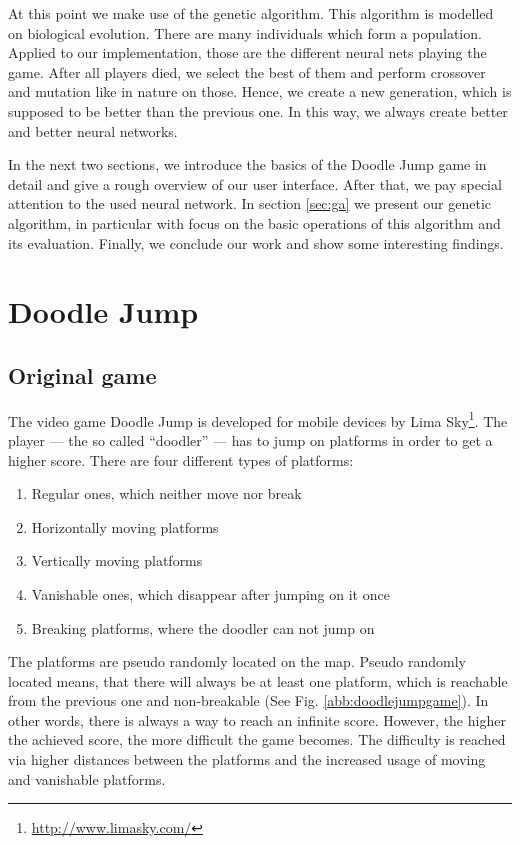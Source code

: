 \documentclass[a4paper,12pt,pagesize,headsepline,bibtotoc,titlepage,abstracton]{scrartcl}
\newcommand{\quot}[1]{{``#1''}}
\begin{document}
At this point we make use of the genetic algorithm. This algorithm is modelled on biological evolution. There are many individuals which form a population. Applied to our implementation, those are the different neural nets playing the game. After all players died, we select the best of them and perform crossover and mutation like in nature on those. Hence, we create a new generation, which is supposed to be better than the previous one. In this way, we always create better and better neural networks.

In the next two sections, we introduce the basics of the Doodle Jump game in detail and give a rough overview of our user interface. After that, we pay special attention to the used neural network. In section \ref{sec:ga} we present our genetic algorithm, in particular with focus on the basic operations of this algorithm and its evaluation. Finally, we conclude our work and show some interesting findings.

\section{Doodle Jump}
\subsection{Original game}
\label{sec:og}

The video game Doodle Jump is developed for mobile devices by Lima Sky\footnote{\url{http://www.limasky.com/}}. The player --- the so called \quot{doodler} --- has to jump on platforms in order to get a higher score. There are four different types of platforms:
\begin{enumerate}
    \item Regular ones, which neither move nor break
    \item Horizontally moving platforms
    \item Vertically moving platforms
    \item Vanishable ones, which disappear after jumping on it once
    \item Breaking platforms, where the doodler can not jump on
\end{enumerate}
The platforms are pseudo randomly located on the map. Pseudo randomly located means, that there will always be at least one platform, which is reachable from the previous one and non-breakable (See Fig. \ref{abb:doodlejumpgame}). In other words, there is always a way to reach an infinite score. However, the higher the achieved score, the more difficult the game becomes. The difficulty is reached via higher distances between the platforms and the increased usage of moving and vanishable platforms.
\end{document}
